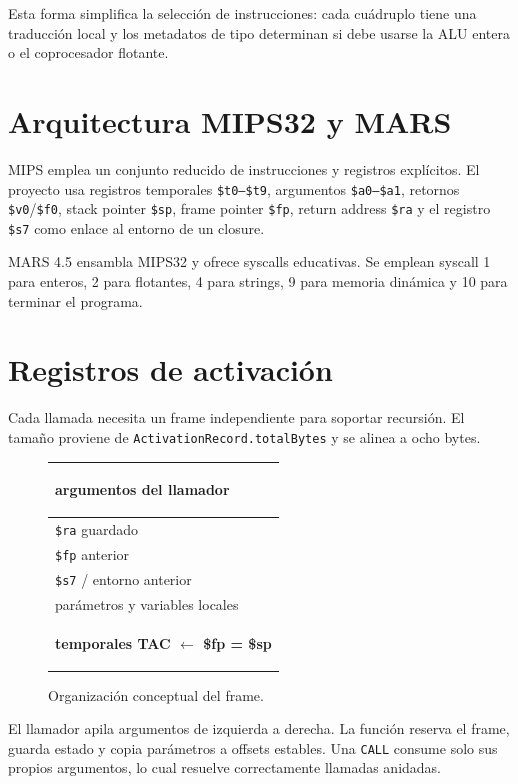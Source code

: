 \documentclass[11pt,letterpaper,oneside]{report}
\newcommand{\codigo}[1]{\texttt{#1}}
\begin{document}
Esta forma simplifica la selecci\'on de instrucciones: cada cu\'adruplo tiene una traducci\'on local y los metadatos de tipo determinan si debe usarse la ALU entera o el coprocesador flotante.

\section{Arquitectura MIPS32 y MARS}

MIPS emplea un conjunto reducido de instrucciones y registros expl\'icitos. El proyecto usa registros temporales \codigo{\$t0--\$t9}, argumentos \codigo{\$a0--\$a1}, retornos \codigo{\$v0}/\codigo{\$f0}, stack pointer \codigo{\$sp}, frame pointer \codigo{\$fp}, return address \codigo{\$ra} y el registro \codigo{\$s7} como enlace al entorno de un closure.

MARS 4.5 ensambla MIPS32 y ofrece syscalls educativas. Se emplean syscall 1 para enteros, 2 para flotantes, 4 para strings, 9 para memoria din\'amica y 10 para terminar el programa.

\section{Registros de activaci\'on}

Cada llamada necesita un frame independiente para soportar recursi\'on. El tama\~no proviene de \codigo{ActivationRecord.totalBytes} y se alinea a ocho bytes.

\begin{figure}[ht]
\centering
\renewcommand{\arraystretch}{1.5}
\begin{tabular}{|>{\centering\arraybackslash}p{9cm}|}\hline
\colorbox{amarillo}{\parbox{8.5cm}{\centering\textbf{argumentos del llamador}}}\\\hline
\codigo{\$ra} guardado\\\hline
\codigo{\$fp} anterior\\\hline
\codigo{\$s7} / entorno anterior\\\hline
par\'ametros y variables locales\\\hline
\colorbox{verde!35}{\parbox{8.5cm}{\centering\textbf{temporales TAC $\leftarrow$ \$fp = \$sp}}}\\\hline
\end{tabular}
\caption{Organizaci\'on conceptual del frame.}
\end{figure}

El llamador apila argumentos de izquierda a derecha. La funci\'on reserva el frame, guarda estado y copia par\'ametros a offsets estables. Una \codigo{CALL} consume solo sus propios argumentos, lo cual resuelve correctamente llamadas anidadas.
\end{document}
